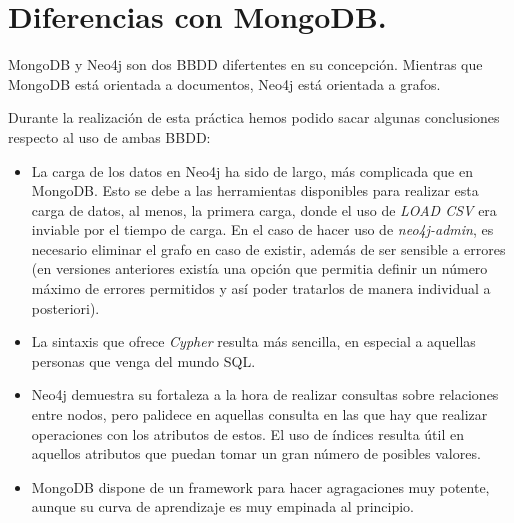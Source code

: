 \section{Diferencias con MongoDB.}

MongoDB y Neo4j son dos \gls{BBDD} difertentes en su concepción. Mientras que MongoDB está orientada a documentos, Neo4j está orientada a grafos.

Durante la realización de esta práctica hemos podido sacar algunas conclusiones respecto al uso de ambas \gls{BBDD}:

\begin{itemize}
 \item La carga de los datos en Neo4j ha sido de largo, más complicada que en MongoDB. Esto se debe a las herramientas disponibles para realizar esta carga de datos, al menos, la primera carga, donde el uso de \textit{LOAD CSV} era inviable por el tiempo de carga. En el caso de hacer uso de \textit{neo4j-admin}, es necesario eliminar el grafo en caso de existir, además de ser sensible a errores (en versiones anteriores existía una opción que permitia definir un número máximo de errores permitidos y así poder tratarlos de manera individual a posteriori).
 \item La sintaxis que ofrece \textit{Cypher} resulta más sencilla, en especial a aquellas personas que venga del mundo \gls{SQL}.
 \item Neo4j demuestra su fortaleza a la hora de realizar consultas sobre relaciones entre nodos, pero palidece en aquellas consulta en las que hay que realizar operaciones con los atributos de estos. El uso de índices resulta útil en aquellos atributos que puedan tomar un gran número de posibles valores.
 \item MongoDB dispone de un framework para hacer agragaciones muy potente, aunque su curva de aprendizaje es muy empinada al principio.
\end{itemize}
